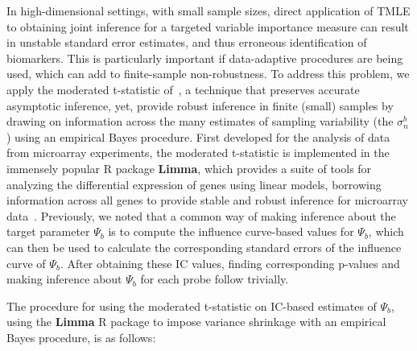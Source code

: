 In high-dimensional settings, with small sample sizes, direct application of
TMLE to obtaining joint inference for a targeted variable importance measure
can result in unstable standard error estimates, and thus erroneous
identification of biomarkers. This is particularly important if data-adaptive
procedures are being used, which can add to finite-sample non-robustness. To
address this problem, we apply the moderated t-statistic
of~\cite{smyth2005limma}, a technique that preserves accurate asymptotic
inference, yet, provide robust inference in finite (small) samples by drawing
on information across the many estimates of sampling variability (the
$\sigma^b_n$) using an empirical Bayes procedure. First developed for the
analysis of data from microarray experiments, the moderated t-statistic is
implemented in the immensely popular R package \textbf{Limma}, which provides a
suite of tools for analyzing the differential expression of genes using linear
models, borrowing information across all genes to provide stable and robust
inference for microarray data~\cite{smyth2005limma}. Previously, we noted that
a common way of making inference about the target parameter $\Psi_b$ is to
compute the influence curve-based values for $\Psi_b$, which can then be used
to calculate the corresponding standard errors of the influence curve of
$\Psi_b$. After obtaining these IC values, finding corresponding p-values and
making inference about $\Psi_b$ for each probe follow trivially.

The procedure for using the moderated t-statistic on IC-based estimates of
$\Psi_b$, using the \textbf{Limma} R package to impose variance shrinkage with
an empirical Bayes procedure, is as follows:


